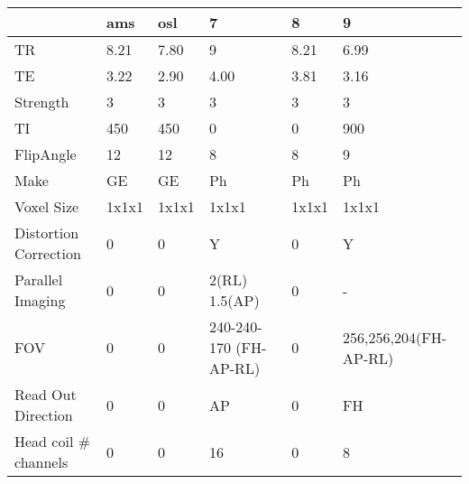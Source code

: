 \begin{table}
[]
\centering
\begin{tabular}{llllll}
\toprule
{} & ams & osl &              7 & 8 &        9 \\
\midrule
TR                    &                   8.21 &               7.80 &                                  9 &               8.21 &                        6.99 \\
TE                    &                   3.22 &               2.90 &                               4.00 &               3.81 &                        3.16 \\
Strength              &                      3 &                  3 &                                  3 &                  3 &                           3 \\
TI                    &                    450 &                450 &                                  0 &                  0 &                         900 \\
FlipAngle             &                     12 &                 12 &                                  8 &                  8 &                           9 \\
Make                  &                     GE &                 GE &                                 Ph &                 Ph &                          Ph \\
Voxel Size            &                  1x1x1 &              1x1x1 &                              1x1x1 &              1x1x1 &                       1x1x1 \\
Distortion Correction &                      0 &                  0 &                                  Y &                  0 &                           Y \\
Parallel Imaging      &                      0 &                  0 &                      2(RL) 1.5(AP) &                  0 &                           - \\
FOV                   &                      0 &                  0 &  240-240-170 (FH-AP-RL) &                  0 &  256,256,204(FH-AP-RL) \\
Read Out Direction    &                      0 &                  0 &                                 AP &                  0 &                          FH \\
Head coil \# channels  &                      0 &                  0 &                                 16 &                  0 &                           8 \\

\end{tabular}
\end{table}
